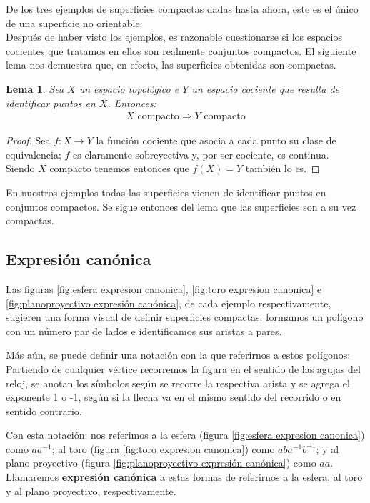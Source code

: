 \documentclass[a4paper,11pt,spanish, twoside, leqno]{tfg-uam}
\newtheorem{lema}[teor]{Lema}
\theoremstyle{definition}
\begin{document}
De los tres ejemplos de superficies compactas dadas hasta ahora, este es el único de una superficie no orientable. 
\\

Después de haber visto los ejemplos, es razonable cuestionarse si los espacios cocientes que tratamos en ellos son realmente conjuntos compactos. El siguiente lema nos demuestra que, en efecto, las superficies obtenidas son compactas.

\begin{lema}\label{lema:compacidadDePoligonos}
	Sea $X$ un espacio topológico e $Y$  un espacio cociente que resulta de identificar puntos en $X$. Entonces:
	\begin{align*}
	\text{$X$ compacto}\Rightarrow\text{$Y$ compacto}
	\end{align*}
\end{lema}
\begin{proof}
	Sea $f:X\longrightarrow Y$ la función cociente que asocia a cada punto su clase de equivalencia; $f$ es claramente sobreyectiva y, por ser cociente, es continua.\\
	Siendo $X$ compacto tenemos entonces que $f(X)=Y$ también lo es.
\end{proof}
En nuestros ejemplos todas las superficies vienen de identificar puntos en conjuntos compactos. Se sigue entonces del lema que las superficies son a su vez compactas.

\subsection*{Expresión canónica}

Las figuras \ref{fig:esfera expresion canonica}, \ref{fig:toro expresion canonica} e \ref{fig:planoproyectivo expresión canónica}, de cada ejemplo respectivamente, sugieren una forma visual de definir superficies compactas: formamos un polígono con un número par de lados e identificamos sus aristas a pares. 

Más aún, se puede definir una notación con la que referirnos a estos polígonos: \\
Partiendo de cualquier vértice recorremos la figura en el sentido de las agujas del reloj, se anotan los símbolos según se recorre la respectiva arista y se agrega el exponente 1 o -1, según si la flecha va en el mismo sentido del recorrido o en sentido contrario.

Con esta notación: nos referimos  a la esfera (figura \ref{fig:esfera expresion canonica}) como $ aa^{-1} $; al toro (figura \ref{fig:toro expresion canonica})  como $ aba^{-1}b^{-1} $; y al plano proyectivo (figura \ref{fig:planoproyectivo expresión canónica}) como $ aa $. Llamaremos \textbf{expresión canónica} a estas formas de referirnos a la esfera, al toro y al plano proyectivo, respectivamente.
\\
\end{document}
